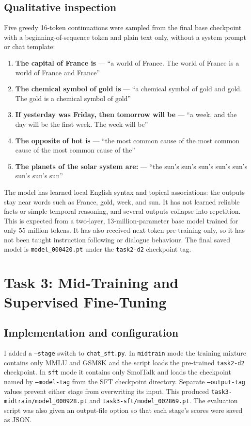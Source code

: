 \documentclass{article}
\begin{document}
\subsection{Qualitative inspection}

Five greedy 16-token continuations were sampled from the final base checkpoint
with a beginning-of-sequence token and plain text only, without a system prompt
or chat template:

\begin{enumerate}
\small
\item \textbf{The capital of France is} --- ``a world of France. The world of
France is a world of France and France''
\item \textbf{The chemical symbol of gold is} --- ``a chemical symbol of gold
and gold. The gold is a chemical symbol of gold''
\item \textbf{If yesterday was Friday, then tomorrow will be} --- ``a week,
and the day will be the first week. The week will be''
\item \textbf{The opposite of hot is} --- ``the most common cause of the most
common cause of the most common cause of the''
\item \textbf{The planets of the solar system are:} --- ``the sun's sun's
sun's sun's sun's sun's sun's sun''
\end{enumerate}

The model has learned local English syntax and topical associations: the
outputs stay near words such as France, gold, week, and sun. It has not learned
reliable facts or simple temporal reasoning, and several outputs collapse into
repetition. This is expected from a two-layer, 13-million-parameter base model
trained for only 55 million tokens. It has also received next-token
pre-training only, so it has not been taught instruction following or dialogue
behaviour. The final saved model is \texttt{model\_000420.pt} under the
\texttt{task2-d2} checkpoint tag.

\section{Task 3: Mid-Training and Supervised Fine-Tuning}

\subsection{Implementation and configuration}

I added a \texttt{--stage} switch to \texttt{chat\_sft.py}. In
\texttt{midtrain} mode the training mixture contains only MMLU and GSM8K and
the script loads the pre-trained \texttt{task2-d2} checkpoint. In \texttt{sft}
mode it contains only SmolTalk and loads the checkpoint named by
\texttt{--model-tag} from the SFT checkpoint directory. Separate
\texttt{--output-tag} values prevent either stage from overwriting its input.
This produced \texttt{task3-midtrain/model\_000928.pt} and
\texttt{task3-sft/model\_002869.pt}. The evaluation script was also given an
output-file option so that each stage's scores were saved as JSON.
\end{document}
